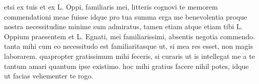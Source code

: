 


 etsi ex tuis et ex L. Oppi, familiaris mei, litteris cognovi te memorem commendationi meae fuisse idque pro tua summa erga me benevolentia proque nostra necessitudine minime sum admiratus, tamen etiam atque etiam tibi L. Oppium praesentem et L. Egnati, mei familiarissimi, absentis negotia commendo. tanta mihi cum eo necessitudo est familiaritasque ut, si mea res esset, non magis laborarem. quapropter gratissimum mihi feceris, si curaris ut is intellegat me a te tantum amari quantum ipse existimo. hoc mihi gratius facere nihil potes, idque ut facias vehementer te rogo.
